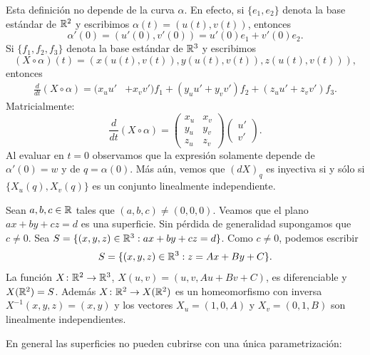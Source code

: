 Esta definición no depende de la curva $\alpha$. En efecto, si $\{e_1,e_2\}$ denota la
base estándar de $\mathbb{R}^2$ y escribimos $\alpha(t)=(u(t),v(t))$, entonces
\[
	\alpha'(0)=(u'(0),v'(0))=u'(0)e_1+v'(0)e_2.
\]
Si 
$\{f_1,f_2,f_3\}$ denota la base estándar de $\mathbb{R}^3$ y escribimos 
\[
	(X\circ\alpha)(t)=(x(u(t),v(t)),y(u(t),v(t)),z(u(t),v(t))),
\]
entonces
\begin{align*}
	\frac{d}{dt}(X\circ\alpha)=(x_uu'&+x_vv') f_1
	+(y_uu'+y_vv') f_2
	+(z_uu'+z_vv') f_3.
\end{align*}
Matricialmente:
\[
	\frac{d}{dt}(X\circ\alpha)=
	\begin{pmatrix}
		x_u & x_v\\
		y_u & y_v\\
		z_u & z_v
	\end{pmatrix}
	\begin{pmatrix}
		u'\\
		v'
	\end{pmatrix}.
\]
Al evaluar en $t=0$ observamos que la expresión solamente depende de
$\alpha'(0)=w$ y de $q=\alpha(0)$. Más aún, vemos que $(dX)_q$ es inyectiva si
y sólo si $\{X_u(q),X_v(q)\}$ es un conjunto linealmente independiente.

\begin{example}
	Sean $a,b,c\in\mathbb{R}$ tales que $(a,b,c)\ne(0,0,0)$.  Veamos que el plano
	$ax+by+cz=d$ es una superficie. Sin pérdida de generalidad supongamos que
	$c\ne 0$. Sea $S=\{(x,y,z)\in\mathbb{R}^3:ax+by+cz=d\}$.  Como $c\ne 0$, podemos
	escribir
	\[
		S=\{(x,y,z)\in\mathbb{R}^3:z=Ax+By+C\}.
	\]
	La función $X\colon\mathbb{R}^2\to\mathbb{R}^3$, $X(u,v)=(u,v,Au+Bv+C)$, es diferenciable y
	$X(\mathbb{R}^2)=S$. Además $X\colon\mathbb{R}^2\to X(\mathbb{R}^2)$ es un homeomorfismo con inversa 
	$X^{-1}(x,y,z)=(x,y)$ y los vectores $X_u=(1,0,A)$ y $X_v=(0,1,B)$ son
	linealmente independientes. 
\end{example}

En general las superficies no pueden cubrirse con una única parametrización:

